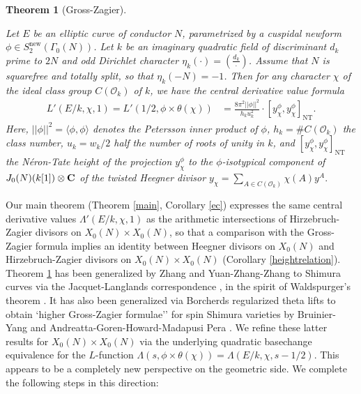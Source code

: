 \documentclass{amsart}
\newtheorem{theorem}{Theorem}[section]
\theoremstyle{definition}
\theoremstyle{definition}
\theoremstyle{definition}
\begin{document}
\begin{theorem}[Gross-Zagier]\label{Gross-Zagier} 

Let $E$ be an elliptic curve of conductor $N$, parametrized by a cuspidal newform $\phi \in S_2^{\operatorname{new}}(\Gamma_0(N))$.
Let $k$ be an imaginary quadratic field of discriminant $d_k$ prime to $2 N$ and odd Dirichlet character $\eta_k(\cdot) = (\frac{d_k}{\cdot})$. 
Assume that $N$ is squarefree and totally split, so that $\eta_k(-N)=-1$. 
Then for any character $\chi$ of the ideal class group $C(\mathcal{O}_k)$ of $k$, we have the central derivative value formula 
\begin{align*} L'(E/k, \chi, 1) = L'(1/2, \phi \times \theta(\chi)) &= \frac{8 \pi ^2 \vert \vert \phi \vert \vert^2}{h_k u_k^2} 
\cdot \left[ y_{\chi}^{\phi}, y_{\chi}^{\phi} \right]_{\operatorname{NT}}. \end{align*}
Here, $\vert \vert \phi \vert \vert^2 = \langle\phi, \phi \rangle$ denotes the Petersson inner product of $\phi$,
$h_k = \#C(\mathcal{O}_k)$ the class number, $u_k = w_k/2$ half the number of roots of unity in $k$,
and $\left[ y_{\chi}^{\phi}, y_{\chi}^{\phi} \right]_{\operatorname{NT}}$ 
the N\'eron-Tate height of the projection $y_{\chi}^{\phi}$
to the $\phi$-isotypical component of $J_0(N)(k[1]) \otimes {\bf{C}}$ of the twisted Heegner divisor
$y_{\chi} = \sum_{A \in C(\mathcal{O}_k)} \chi(A) y^A.$ \end{theorem}
 
Our main theorem (Theorem \ref{main}, Corollary \ref{ec}) expresses the same central derivative values 
$\Lambda'(E/k, \chi, 1)$ as the arithmetic intersections of Hirzebruch-Zagier divisors on $X_0(N) \times X_0(N)$, 
so that a comparison with the Gross-Zagier formula implies an identity between Heegner divisors on $X_0(N)$ and Hirzebruch-Zagier divisors on $X_0(N) \times X_0(N)$ (Corollary \ref{heightrelation}).
Theorem \ref{Gross-Zagier} has been generalized by Zhang \cite{SWZ, SWZ2, SWZ3, SWZ4} and Yuan-Zhang-Zhang \cite{YZZ} to Shimura curves via the Jacquet-Langlands 
correspondence \cite{Ja, JL}, in the spirit of Waldspurger's theorem \cite{Wa}. It has also been generalized via Borcherds regularized theta lifts to obtain `higher Gross-Zagier formulae'' 
for spin Shimura varieties by Bruinier-Yang \cite{BY} and Andreatta-Goren-Howard-Madapusi Pera \cite{AGHMP}. 
We refine these latter results for $X_0(N) \times X_0(N)$ via the underlying quadratic 
basechange equivalence for the $L$-function $\Lambda(s, \phi \times \theta(\chi)) = \Lambda(E/k, \chi, s-1/2)$. 
This appears to be a completely new perspective on the geometric side. We complete the following steps in this direction: \\
\end{document}
